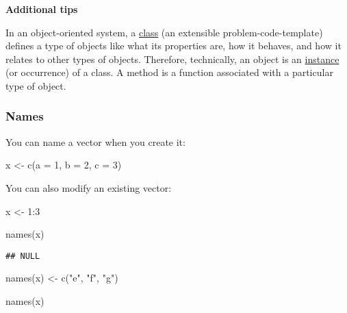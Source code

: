 \documentclass[
]{book}
\newenvironment{Shaded}{\begin{snugshade}}{\end{snugshade}}
\newcommand{\AttributeTok}[1]{\textcolor[rgb]{0.77,0.63,0.00}{#1}}
\newcommand{\DecValTok}[1]{\textcolor[rgb]{0.00,0.00,0.81}{#1}}
\newcommand{\FunctionTok}[1]{\textcolor[rgb]{0.00,0.00,0.00}{#1}}
\newcommand{\NormalTok}[1]{#1}
\newcommand{\OtherTok}[1]{\textcolor[rgb]{0.56,0.35,0.01}{#1}}
\newcommand{\SpecialCharTok}[1]{\textcolor[rgb]{0.00,0.00,0.00}{#1}}
\newcommand{\StringTok}[1]{\textcolor[rgb]{0.31,0.60,0.02}{#1}}
\begin{document}
\textbf{Additional tips}

In an object-oriented system, a \href{https://www.google.com/search?q=what+is+class+programming\&oq=what+is+class+programming\&aqs=chrome.0.0l6.3543j0j4\&sourceid=chrome\&ie=UTF-8}{class} (an extensible problem-code-template) defines a type of objects like what its properties are, how it behaves, and how it relates to other types of objects. Therefore, technically, an object is an \href{https://en.wikipedia.org/wiki/Instance_(computer_science)}{instance} (or occurrence) of a class. A method is a function associated with a particular type of object.

\hypertarget{names}{%
\subsubsection{Names}\label{names}}

You can name a vector when you create it:

\begin{Shaded}
\begin{Highlighting}[]
\NormalTok{x }\OtherTok{\textless{}{-}} \FunctionTok{c}\NormalTok{(}\AttributeTok{a =} \DecValTok{1}\NormalTok{, }\AttributeTok{b =} \DecValTok{2}\NormalTok{, }\AttributeTok{c =} \DecValTok{3}\NormalTok{)}
\end{Highlighting}
\end{Shaded}

You can also modify an existing vector:

\begin{Shaded}
\begin{Highlighting}[]
\NormalTok{x }\OtherTok{\textless{}{-}} \DecValTok{1}\SpecialCharTok{:}\DecValTok{3}

\FunctionTok{names}\NormalTok{(x)}
\end{Highlighting}
\end{Shaded}

\begin{verbatim}
## NULL
\end{verbatim}

\begin{Shaded}
\begin{Highlighting}[]
\FunctionTok{names}\NormalTok{(x) }\OtherTok{\textless{}{-}} \FunctionTok{c}\NormalTok{(}\StringTok{"e"}\NormalTok{, }\StringTok{"f"}\NormalTok{, }\StringTok{"g"}\NormalTok{)}

\FunctionTok{names}\NormalTok{(x)}
\end{Highlighting}
\end{Shaded}
\end{document}
